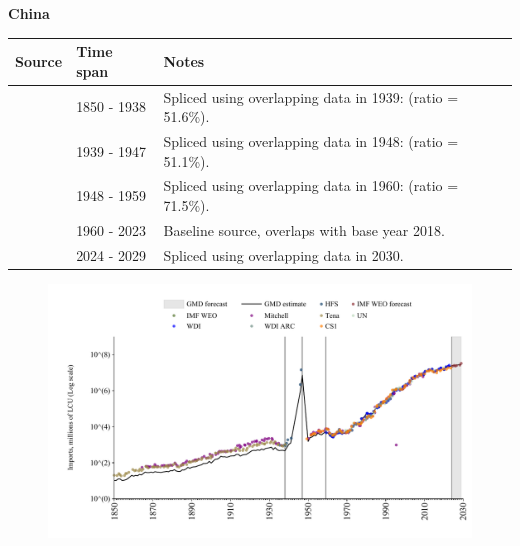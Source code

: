 \documentclass[12pt,a4paper,landscape]{article}
\begin{document}
\begin{adjustbox}{max totalsize={\paperwidth}{\paperheight},center}
\begin{minipage}[t][\textheight][t]{\textwidth}
\vspace*{0.5cm}
{}
\begin{center}
{\Large\bfseries China}
\end{center}
\vspace{0.5cm}
\begin{table}[H]
\centering
\small
\begin{tabular}{|l|l|l|}
\hline
\textbf{Source} & \textbf{Time span} & \textbf{Notes} \\
\hline
\rowcolor{white}\cite{Tena}& 1850 - 1938 &Spliced using overlapping data in 1939: (ratio = 51.6\%).\\
\rowcolor{lightgray}\cite{HFS}& 1939 - 1947 &Spliced using overlapping data in 1948: (ratio = 51.1\%).\\
\rowcolor{white}\cite{CS1_CHN}& 1948 - 1959 &Spliced using overlapping data in 1960: (ratio = 71.5\%).\\
\rowcolor{lightgray}\cite{WDI}& 1960 - 2023 &Baseline source, overlaps with base year 2018.\\
\rowcolor{white}\cite{IMF_WEO_forecast}& 2024 - 2029 &Spliced using overlapping data in 2030.\\
\hline
\end{tabular}
\end{table}
\begin{figure}[H]
\centering
\includegraphics[width=\textwidth,height=0.6\textheight,keepaspectratio]{graphs/CHN_imports.pdf}
\end{figure}
\end{minipage}
\end{adjustbox}
\end{document}
